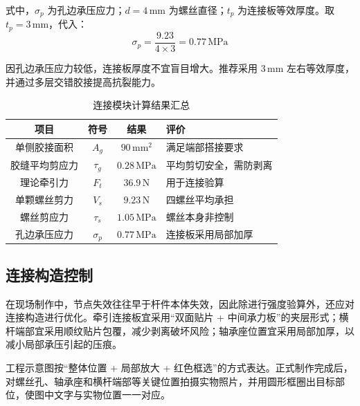 \documentclass[UTF8,a4paper,12pt,fontset=none]{ctexart}
\numberwithin{equation}{section}
\numberwithin{figure}{section}
\numberwithin{table}{section}
\newcommand{\mm}{\,\mathrm{mm}}
\newcommand{\Nunit}{\,\mathrm{N}}
\newcommand{\MPa}{\,\mathrm{MPa}}
\begin{document}
式中，$\sigma_p$ 为孔边承压应力；$d=4\mm$ 为螺丝直径；$t_p$ 为连接板等效厚度。取 $t_p=3\mm$，代入：
\begin{equation}
  \sigma_p=\frac{9.23}{4\times3}=0.77\MPa
\end{equation}

因孔边承压应力较低，连接板厚度不宜盲目增大。推荐采用 $3\mm$ 左右等效厚度，并通过多层交错胶接提高抗裂能力。

\begin{table}[H]
\centering
\caption{连接模块计算结果汇总}
\label{tab:joint-summary}
\begin{tabularx}{\linewidth}{c c c Y}
\toprule
\textbf{项目} & \textbf{符号} & \textbf{结果} & \textbf{评价} \\\midrule
单侧胶接面积 & $A_g$ & $90\mm^2$ & 满足端部搭接要求 \\
胶缝平均剪应力 & $\tau_g$ & $0.28\MPa$ & 平均剪切安全，需防剥离 \\
理论牵引力 & $F_t$ & $36.9\Nunit$ & 用于连接验算 \\
单颗螺丝剪力 & $V_s$ & $9.23\Nunit$ & 四螺丝平均承担 \\
螺丝剪应力 & $\tau_s$ & $1.05\MPa$ & 螺丝本身非控制 \\
孔边承压应力 & $\sigma_p$ & $0.77\MPa$ & 连接板采用局部加厚 \\
\bottomrule
\end{tabularx}
\end{table}

\subsection{连接构造控制}
在现场制作中，节点失效往往早于杆件本体失效，因此除进行强度验算外，还应对连接构造进行优化。牵引连接板宜采用“双面贴片 + 中间承力板”的夹层形式；横杆端部宜采用顺纹贴片包覆，减少剥离破坏风险；轴承座位置宜采用局部加厚，以减小局部承压引起的压痕。

工程示意图按“整体位置 + 局部放大 + 红色框选”的方式表达。正式制作完成后，对螺丝孔、轴承座和横杆端部等关键位置拍摄实物照片，并用圆形框圈出目标部位，使图中文字与实物位置一一对应。
\end{document}
